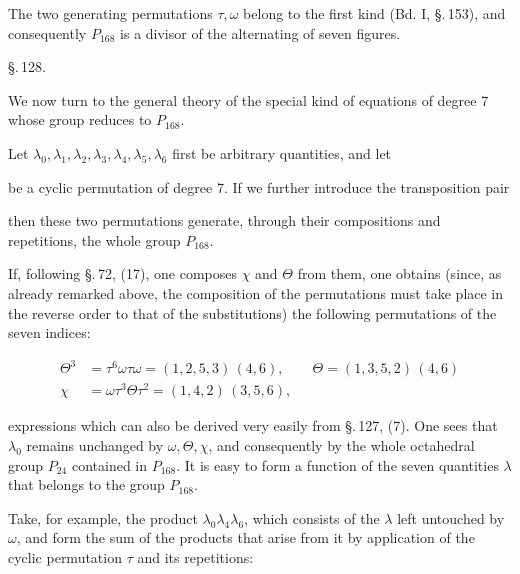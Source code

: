 The two generating permutations $\tau, \omega$ belong to the first kind (Bd. I, \S.\,153), and consequently $P_{168}$ is a divisor of the alternating  of seven figures.

\begin{center}
\S.\,128.

\end{center}

We now turn to the general theory of the special kind of equations of degree 7 whose  group reduces to $P_{168}$.

Let $\lambda_0, \lambda_1, \lambda_2, \lambda_3, \lambda_4, \lambda_5, \lambda_6$ first be arbitrary quantities, and let


be a cyclic permutation of degree 7. If we further introduce the transposition pair


then these two permutations generate, through their compositions and repetitions, the whole group $P_{168}$.

If, following \S.\,72, (17), one composes $\chi$ and $\Theta$ from them, one obtains (since, as already remarked above, the composition of the permutations must take place in the reverse order to that of the substitutions) the following permutations of the seven indices:

\[
\begin{aligned}
\Theta^3 &= \tau^6 \omega \tau \omega = (1, 2, 5, 3)\,(4, 6),
\qquad \Theta = (1, 3, 5, 2)\,(4, 6) \\
\chi &= \omega \tau^3 \Theta \tau^2 = (1, 4, 2)\,(3, 5, 6),
\end{aligned}
\]

expressions which can also be derived very easily from \S.\,127, (7). One sees that $\lambda_0$ remains unchanged by $\omega, \Theta, \chi$, and consequently by the whole octahedral group $P_{24}$ contained in $P_{168}$. It is easy to form a function of the seven quantities $\lambda$ that belongs to the group $P_{168}$.

Take, for example, the product $\lambda_0 \lambda_4 \lambda_6$, which consists of the $\lambda$ left untouched by $\omega$, and form the sum of the products that arise from it by application of the cyclic permutation $\tau$ and its repetitions:

